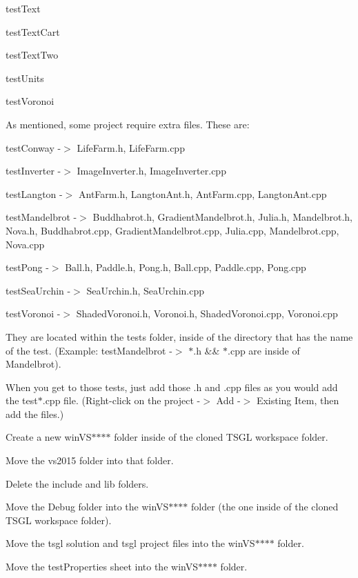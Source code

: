 test\-Text

test\-Text\-Cart

test\-Text\-Two

test\-Units

test\-Voronoi

As mentioned, some project require extra files. These are\-:


\begin{DoxyItemize}
\item test\-Conway -\/$>$ Life\-Farm.\-h, Life\-Farm.\-cpp
\item test\-Inverter -\/$>$ Image\-Inverter.\-h, Image\-Inverter.\-cpp
\item test\-Langton -\/$>$ Ant\-Farm.\-h, Langton\-Ant.\-h, Ant\-Farm.\-cpp, Langton\-Ant.\-cpp
\item test\-Mandelbrot -\/$>$ Buddhabrot.\-h, Gradient\-Mandelbrot.\-h, Julia.\-h, Mandelbrot.\-h, Nova.\-h, Buddhabrot.\-cpp, Gradient\-Mandelbrot.\-cpp, Julia.\-cpp, Mandelbrot.\-cpp, Nova.\-cpp
\item test\-Pong -\/$>$ Ball.\-h, Paddle.\-h, Pong.\-h, Ball.\-cpp, Paddle.\-cpp, Pong.\-cpp
\item test\-Sea\-Urchin -\/$>$ Sea\-Urchin.\-h, Sea\-Urchin.\-cpp
\item test\-Voronoi -\/$>$ Shaded\-Voronoi.\-h, Voronoi.\-h, Shaded\-Voronoi.\-cpp, Voronoi.\-cpp
\end{DoxyItemize}

They are located within the tests folder, inside of the directory that has the name of the test. (Example\-: test\-Mandelbrot -\/$>$ $\ast$.h \&\& $\ast$.cpp are inside of Mandelbrot).

When you get to those tests, just add those .h and .cpp files as you would add the test$\ast$.cpp file. (Right-\/click on the project -\/$>$ Add -\/$>$ Existing Item, then add the files.)

Create a new win\-V\-S$\ast$$\ast$$\ast$$\ast$ folder inside of the cloned T\-S\-G\-L workspace folder.

Move the vs2015 folder into that folder.

Delete the include and lib folders.

Move the Debug folder into the win\-V\-S$\ast$$\ast$$\ast$$\ast$ folder (the one inside of the cloned T\-S\-G\-L workspace folder).

Move the tsgl solution and tsgl project files into the win\-V\-S$\ast$$\ast$$\ast$$\ast$ folder.

Move the test\-Properties sheet into the win\-V\-S$\ast$$\ast$$\ast$$\ast$ folder.

